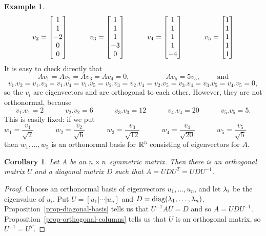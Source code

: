 \documentclass[reqno]{amsart}
\newtheorem{corollary}[theorem]{Corollary}
\theoremstyle{definition}
\newtheorem{example}[theorem]{Example}
\begin{document}
\begin{example}
\[    v_2 = \left[\begin{matrix}  1 \\  1 \\ -2 \\  0 \\  0 \end{matrix}\right] \hspace{3em}
    v_3 = \left[\begin{matrix}  1 \\  1 \\  1 \\ -3 \\  0 \end{matrix}\right] \hspace{3em}
    v_4 = \left[\begin{matrix}  1 \\  1 \\  1 \\  1 \\ -4 \end{matrix}\right] \hspace{3em}
    v_5 = \left[\begin{matrix}  1 \\  1 \\  1 \\  1 \\  1 \end{matrix}\right] 
 \]
 It is easy to check directly that 
 \[ Av_1=Av_2=Av_3=Av_4=0, \hspace{5em} Av_5=5v_5, \qquad \text{ and} \]
 \[ v_1.v_2=v_1.v_3=v_1.v_4=v_1.v_5=
    v_2.v_3=v_2.v_4=v_2.v_5=v_3.v_4=v_3.v_5=v_4.v_5 = 0,
 \]
 so the $v_i$ are eigenvectors and are orthogonal to each other.
 However, they are not orthonormal, because 
 \[ v_1.v_1 = 2 \hspace{3em}
    v_2.v_2 = 6 \hspace{3em}
    v_3.v_3 = 12 \hspace{3em}
    v_4.v_4 = 20 \hspace{3em}
    v_5.v_5 = 5.
 \]
 This is easily fixed: if we put 
 \[ w_1 = \frac{v_1}{\sqrt{2}} \hspace{3em}
    w_2 = \frac{v_2}{\sqrt{6}} \hspace{3em}
    w_3 = \frac{v_3}{\sqrt{12}} \hspace{3em}
    w_4 = \frac{v_4}{\sqrt{20}} \hspace{3em}
    w_5 = \frac{v_5}{\sqrt{5}} \hspace{3em}
 \]
 then $w_1,\dotsc,w_5$ is an orthonormal basis for ${\mathbb{R}}^5$ consisting
 of eigenvectors for $A$.
\end{example}

\begin{corollary}\label{cor-symmetric-diag}
 Let $A$ be an $n\times n$ symmetric matrix.  Then there is an
 orthogonal matrix $U$ and a diagonal matrix $D$ such that 
 $A=UDU^T=UDU^{-1}$.
\end{corollary}
\begin{proof}
 Choose an orthonormal basis of eigenvectors $u_1,\dotsc,u_n$, and let
 $\lambda_i$ be the eigenvalue of $u_i$.  Put $U=[u_1|\dotsb|u_n]$ and
 $D=\operatorname{diag}(\lambda_1,\dotsc,\lambda_n)$.
 Proposition~\ref{prop-diagonal-basis} tells us that $U^{-1}AU=D$ and
 so $A=UDU^{-1}$.  Proposition~\ref{prop-orthogonal-columns} tells us
 that $U$ is an orthogonal matrix, so $U^{-1}=U^T$.  
\end{proof}
\end{document}
